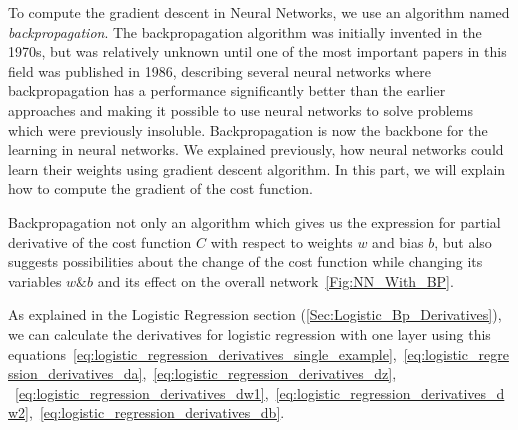 To compute the gradient descent in Neural Networks, we use an algorithm named \textit{backpropagation}. The backpropagation algorithm was initially invented in the 1970s, but was relatively unknown until one of the most important papers in this field was published in 1986, describing several neural networks where backpropagation has a performance significantly better than the earlier approaches and making it possible to use neural networks to solve problems which were previously insoluble. Backpropagation is now the backbone for the learning in neural networks.
We explained previously, how neural networks could learn their weights using gradient descent algorithm. In this part, we will explain how to compute the gradient of the cost function.

Backpropagation not only an algorithm which gives us the expression for partial derivative of the cost function $C$ with respect to weights $w$ and bias $b$, but also suggests possibilities about the change of the cost function while changing its variables $w \& b$ and its effect on the overall network~\ref{Fig:NN_With_BP}.

As explained in the Logistic Regression section (\ref{Sec:Logistic_Bp_Derivatives}), we can calculate the derivatives for logistic regression with one layer using this equations~\eqref{eq:logistic_regression_derivatives_single_example},~\eqref{eq:logistic_regression_derivatives_da},~\eqref{eq:logistic_regression_derivatives_dz},\\
~\eqref{eq:logistic_regression_derivatives_dw1},~\eqref{eq:logistic_regression_derivatives_dw2},~\eqref{eq:logistic_regression_derivatives_db}.\\

